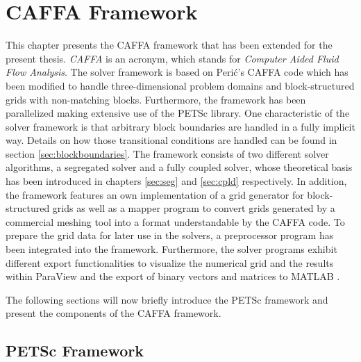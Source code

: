 \chapter{CAFFA Framework}
\label{sec:caffa}

This chapter presents the CAFFA framework that has been extended for the present thesis. \emph{CAFFA} is an acronym, which stands for \emph{Computer Aided Fluid Flow Analysis}. The solver framework is based on Peri\'c's CAFFA code \cite{ferziger02} which has been modified to handle three-dimensional problem domains and block-structured grids with non-matching blocks. Furthermore, the framework has been parallelized making extensive use of the PETSc library. One characteristic of the solver framework is that arbitrary block boundaries are handled in a fully implicit way. Details on how those transitional conditions are handled can be found in section \ref{sec:blockboundaries}. The framework consists of two different solver algorithms, a segregated solver and a fully coupled solver, whose theoretical basis has been introduced in chapters \ref{sec:seg} and \ref{sec:cpld} respectively. In addition, the framework features an own implementation of a grid generator for block-structured grids as well as a mapper program to convert grids generated by a commercial meshing tool into a format understandable by the CAFFA code. To prepare the grid data for later use in the solvers, a preprocessor program has been integrated into the framework. Furthermore, the solver programs exhibit different export functionalities to visualize the numerical grid and the results within ParaView \cite{paraview} and the export of binary vectors and matrices to MATLAB \textregistered \cite{matlab}.

The following sections will now briefly introduce the PETSc framework and present the components of the CAFFA framework.

\section{PETSc Framework}
\label{sec:petsc}

